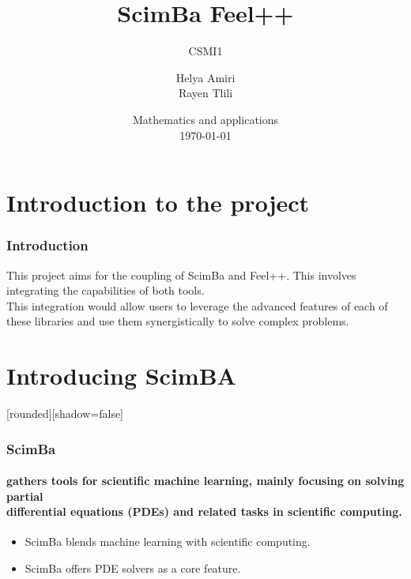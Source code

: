 \documentclass[10pt]{beamer}
\title{ScimBa Feel++}
\subtitle{CSMI1}
\author{ Helya Amiri \\ Rayen Tlili }
\institute[]{University of Strasbourg \\ \smallskip}
\date[\today]{Mathematics and applications \\ \today}
\begin{document}
\frame{\titlepage}
\begin{frame}
    \tableofcontents
\end{frame}

\section{Introduction to the project}
\begin{frame}
    \frametitle{Introduction}
    This project aims for the coupling of ScimBa and Feel++. This involves integrating the capabilities of both tools. 
    \\This integration would allow users to leverage the advanced features of each of these libraries and use them synergistically to solve complex problems.
\end{frame}


\section{Introducing ScimBA}
\begin{frame}
    [rounded][shadow=false]
    \frametitle{ScimBa}
    \framesubtitle{ gathers tools for scientific machine learning, mainly focusing on solving partial  \\  differential equations (PDEs) and related tasks in scientific computing.}

    \begin{itemize}
        \item ScimBa blends machine learning with scientific computing. 
        

        \item ScimBa offers PDE solvers as a core feature. 
        
    \end{itemize}
\end{frame}
\end{document}
